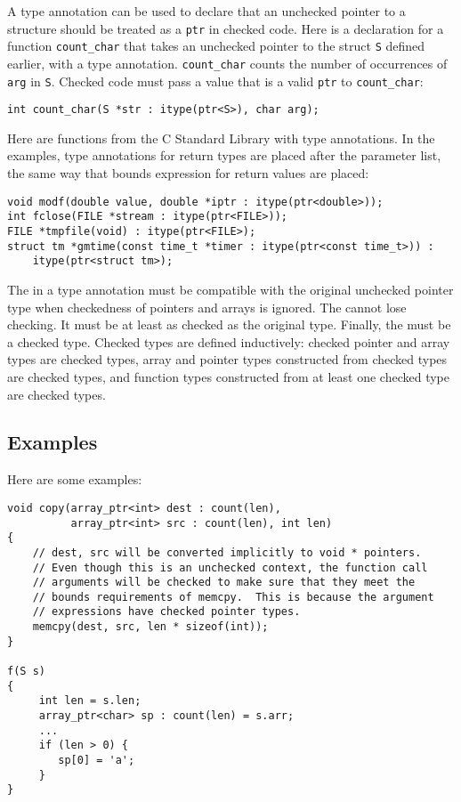 A type annotation can be used to declare that an unchecked
pointer to a structure should be treated as a \verb+ptr+ in
checked code. Here is a declaration for a function
\verb+count_char+ that takes
an unchecked pointer to the struct \texttt{S} defined earlier,
with a type annotation. \verb+count_char+ counts the number
of occurrences of \verb+arg+ in \verb+S+. Checked code must pass a
value that is a valid \verb+ptr+ to \verb+count_char+:
\begin{verbatim}
int count_char(S *str : itype(ptr<S>), char arg);
\end{verbatim}

Here are functions from the C Standard Library with type annotations.
In the examples, type annotations for return types are placed 
after the parameter list, the same way that bounds expression for
return values are placed:
\begin{verbatim}
void modf(double value, double *iptr : itype(ptr<double>));
int fclose(FILE *stream : itype(ptr<FILE>));
FILE *tmpfile(void) : itype(ptr<FILE>);
struct tm *gmtime(const time_t *timer : itype(ptr<const time_t>)) :
    itype(ptr<struct tm>);
\end{verbatim}

The  in a type annotation must be compatible
with the original unchecked pointer type when checkedness
of pointers and arrays is ignored. The  cannot
lose checking.  It must be at least as checked as the
original type.  Finally, the  must be
a checked type.   Checked types are defined inductively:
checked pointer and array types are checked types,
array and pointer types constructed from checked types
are checked types, and function types constructed from
at least one checked type are checked types.

\subsection{Examples}
\label{section:bounds-safe-interface-examples}

Here are some examples:
\begin{verbatim}
void copy(array_ptr<int> dest : count(len),
          array_ptr<int> src : count(len), int len)
{
    // dest, src will be converted implicitly to void * pointers.
    // Even though this is an unchecked context, the function call
    // arguments will be checked to make sure that they meet the
    // bounds requirements of memcpy.  This is because the argument
    // expressions have checked pointer types.
    memcpy(dest, src, len * sizeof(int));
}

f(S s) 
{
     int len = s.len;
     array_ptr<char> sp : count(len) = s.arr;
     ...
     if (len > 0) {
        sp[0] = 'a';
     }
}
\end{verbatim}

